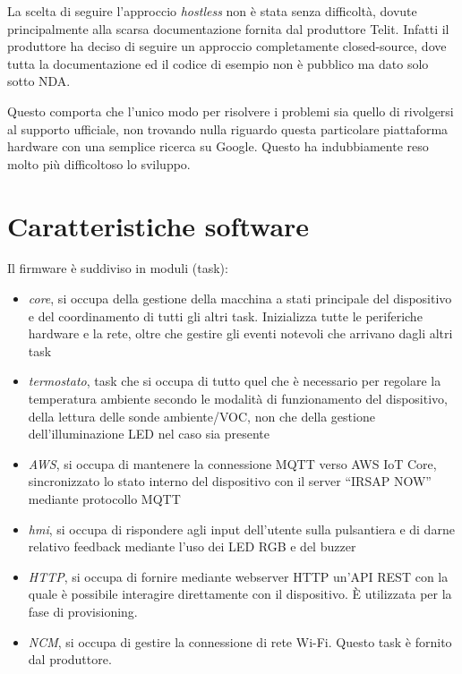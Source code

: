\documentclass[12pt,a4paper,twoside,titlepage]{book}
\begin{document}
La scelta di seguire l'approccio \textit{hostless} non è stata senza difficoltà, dovute
principalmente alla scarsa documentazione fornita dal produttore Telit. Infatti il
produttore ha deciso di seguire un approccio completamente closed-source, dove tutta
la documentazione ed il codice di esempio non è pubblico ma dato solo sotto NDA.

Questo comporta che l'unico modo per risolvere i problemi sia quello di rivolgersi
al supporto ufficiale, non trovando nulla riguardo questa particolare piattaforma
hardware con una semplice ricerca su Google. Questo ha indubbiamente reso molto più
difficoltoso lo sviluppo.

\section{Caratteristiche software}

Il firmware è suddiviso in moduli (task):

\begin{itemize}
    \item \textit{core}, si occupa della gestione della macchina a stati principale
        del dispositivo e del coordinamento di tutti gli altri task. Inizializza tutte
        le periferiche hardware e la rete, oltre che gestire
        gli eventi notevoli che arrivano dagli altri task
    \item \textit{termostato}, task che si occupa di tutto quel che è necessario
        per regolare la temperatura ambiente secondo le modalità di funzionamento del dispositivo,
        della lettura delle sonde ambiente/VOC, non che della gestione dell'illuminazione LED
        nel caso sia presente
    \item \textit{AWS}, si occupa di mantenere la connessione MQTT verso AWS IoT Core,
        sincronizzato lo stato interno del dispositivo con il server ``IRSAP NOW'' mediante protocollo MQTT
    \item \textit{hmi}, si occupa di rispondere agli input dell'utente
        sulla pulsantiera e di darne relativo feedback mediante l'uso dei LED RGB e del buzzer
    \item \textit{HTTP}, si occupa di fornire mediante webserver HTTP un'API REST con
        la quale è possibile interagire direttamente con il dispositivo. È utilizzata
        per la fase di provisioning.
    \item \textit{NCM}, si occupa di gestire la connessione di rete Wi-Fi. Questo task
        è fornito dal produttore.
\end{itemize}
\end{document}
